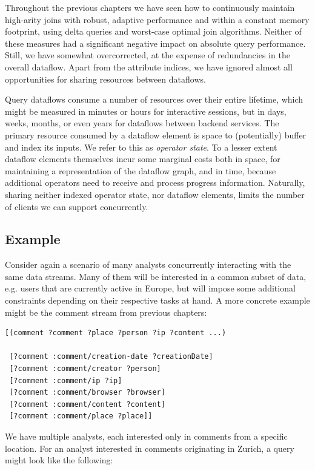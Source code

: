 \documentclass[../catalog.tex]{subfiles}
\begin{document}
Throughout the previous chapters we have seen how to continuously
maintain high-arity joins with robust, adaptive performance and within
a constant memory footprint, using delta queries and worst-case
optimal join algorithms. Neither of these measures had a significant
negative impact on absolute query performance. Still, we have somewhat
overcorrected, at the expense of redundancies in the overall
dataflow. Apart from the attribute indices, we have ignored almost all
opportunities for sharing resources between dataflows.

Query dataflows consume a number of resources over their entire
lifetime, which might be measured in minutes or hours for interactive
sessions, but in days, weeks, months, or even years for dataflows
between backend services. The primary resource consumed by a dataflow
element is space to (potentially) buffer and index its inputs. We
refer to this as \emph{operator state}. To a lesser extent dataflow
elements themselves incur some marginal costs both in space, for
maintaining a representation of the dataflow graph, and in time,
because additional operators need to receive and process progress
information. Naturally, sharing neither indexed operator state, nor
dataflow elements, limits the number of clients we can support
concurrently.

\subsection{Example}

Consider again a scenario of many analysts concurrently interacting
with the same data streams. Many of them will be interested in a
common subset of data, e.g. users that are currently active in Europe,
but will impose some additional constraints depending on their
respective tasks at hand. A more concrete example might be the comment
stream from previous chapters:

\begin{verbatim}
[(comment ?comment ?place ?person ?ip ?content ...)

 [?comment :comment/creation-date ?creationDate]
 [?comment :comment/creator ?person]
 [?comment :comment/ip ?ip]
 [?comment :comment/browser ?browser]
 [?comment :comment/content ?content]
 [?comment :comment/place ?place]]
\end{verbatim}

We have multiple analysts, each interested only in comments from a
specific location. For an analyst interested in comments originating
in Zurich, a query might look like the following:
\end{document}
